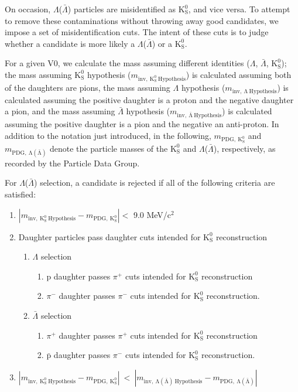 \documentclass[ALICE,manyauthors]{cernphprep}
\newcommand{\Lam}{$\Lambda$\xspace}
\newcommand{\ALam}{$\bar{\Lambda}$\xspace}
\newcommand{\LamALam}{$\Lambda$($\bar{\Lambda}$)\xspace}
\newcommand{\Ks}{$\mathrm{K^{0}_{S}}$\xspace}
\begin{document}
On occasion, \LamALam particles are misidentified as \Ks, and vice versa.  To attempt to remove these contaminations without throwing away good candidates, we impose a set of misidentification cuts.  The intent of these cuts is to judge whether a candidate is more likely a \LamALam or a \Ks.  

For a given V0, we calculate the mass assuming different identities (\Lam, \ALam, \Ks); the mass assuming \Ks hypothesis ($m_{\mathrm{inv,~ K^{0}_{S}~ Hypothesis}}$) is calculated assuming both of the daughters are pions, the mass assuming \Lam hypothesis ($m_{\mathrm{inv,~ \Lambda~ Hypothesis}}$) is calculated assuming the positive daughter is a proton and the negative daughter a pion, and the mass assuming \ALam hypothesis ($m_{\mathrm{inv,~ \bar{\Lambda}~ Hypothesis}}$) is calculated assuming the positive daughter is a pion and the negative an anti-proton.  In addition to the notation just introduced, in the following, $m_{\mathrm{PDG,~ K^{0}_{S}}}$ and $m_{\mathrm{PDG,~ \Lambda(\bar{\Lambda})}}$ denote the particle masses of the \Ks and \LamALam, respectively, as recorded by the Particle Data Group.

 For \LamALam selection, a candidate is rejected if all of the following criteria are satisfied:

\begin{enumerate}
 \item $\left|m_{\mathrm{inv,~ K^{0}_{S}~ Hypothesis}} - m_{\mathrm{PDG,~ K^{0}_{S}}}\right| < $ 9.0 MeV/c$^{2}$
 \item Daughter particles pass daughter cuts intended for \Ks reconstruction
 \begin{enumerate}
  \item \Lam selection
  \begin{enumerate}
   \item p daughter passes $\pi^{+}$ cuts intended for \Ks reconstruction
   \item $\pi^{-}$ daughter passes $\pi^{-}$ cuts intended for \Ks reconstruction.
  \end{enumerate}
  \item \ALam selection
  \begin{enumerate}
   \item $\pi^{+}$ daughter passes $\pi^{+}$ cuts intended for \Ks reconstruction
   \item $\bar{\mathrm{p}}$ daughter passes $\pi^{-}$ cuts intended for \Ks reconstruction.
  \end{enumerate}  
 \end{enumerate}
 \item $\left|m_{\mathrm{inv,~ K^{0}_{S}~ Hypothesis}} - m_{\mathrm{PDG,~ K^{0}_{S}}}\right|~ < ~\left|m_{\mathrm{inv,~ \Lambda(\bar{\Lambda})~ Hypothesis}} - m_{\mathrm{PDG,~ \Lambda(\bar{\Lambda})}}\right|$
\end{enumerate} 
\end{document}
